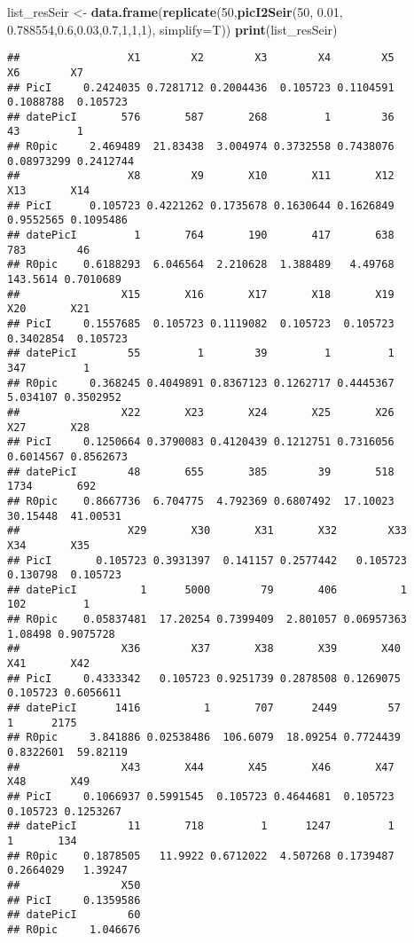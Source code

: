 \documentclass[
]{article}
\newenvironment{Shaded}{\begin{snugshade}}{\end{snugshade}}
\newcommand{\DataTypeTok}[1]{\textcolor[rgb]{0.13,0.29,0.53}{#1}}
\newcommand{\DecValTok}[1]{\textcolor[rgb]{0.00,0.00,0.81}{#1}}
\newcommand{\FloatTok}[1]{\textcolor[rgb]{0.00,0.00,0.81}{#1}}
\newcommand{\KeywordTok}[1]{\textcolor[rgb]{0.13,0.29,0.53}{\textbf{#1}}}
\newcommand{\NormalTok}[1]{#1}
\newcommand{\StringTok}[1]{\textcolor[rgb]{0.31,0.60,0.02}{#1}}
\begin{document}
\begin{Shaded}
\begin{Highlighting}[]
\NormalTok{list_resSeir <-}\StringTok{ }\KeywordTok{data.frame}\NormalTok{(}\KeywordTok{replicate}\NormalTok{(}\DecValTok{50}\NormalTok{,}\KeywordTok{picI2Seir}\NormalTok{(}\DecValTok{50}\NormalTok{, }\FloatTok{0.01}\NormalTok{, }\FloatTok{0.788554}\NormalTok{,}\FloatTok{0.6}\NormalTok{,}\FloatTok{0.03}\NormalTok{,}\FloatTok{0.7}\NormalTok{,}\DecValTok{1}\NormalTok{,}\DecValTok{1}\NormalTok{,}\DecValTok{1}\NormalTok{), }\DataTypeTok{simplify=}\NormalTok{T))}
\KeywordTok{print}\NormalTok{(list_resSeir)}
\end{Highlighting}
\end{Shaded}

\begin{verbatim}
##                 X1        X2        X3        X4        X5         X6        X7
## PicI     0.2424035 0.7281712 0.2004436  0.105723 0.1104591  0.1088788  0.105723
## datePicI       576       587       268         1        36         43         1
## R0pic     2.469489  21.83438  3.004974 0.3732558 0.7438076 0.08973299 0.2412744
##                 X8        X9       X10       X11       X12       X13       X14
## PicI      0.105723 0.4221262 0.1735678 0.1630644 0.1626849 0.9552565 0.1095486
## datePicI         1       764       190       417       638       783        46
## R0pic    0.6188293  6.046564  2.210628  1.388489   4.49768  143.5614 0.7010689
##                X15       X16       X17       X18       X19       X20       X21
## PicI     0.1557685  0.105723 0.1119082  0.105723  0.105723 0.3402854  0.105723
## datePicI        55         1        39         1         1       347         1
## R0pic     0.368245 0.4049891 0.8367123 0.1262717 0.4445367  5.034107 0.3502952
##                X22       X23       X24       X25       X26       X27       X28
## PicI     0.1250664 0.3790083 0.4120439 0.1212751 0.7316056 0.6014567 0.8562673
## datePicI        48       655       385        39       518      1734       692
## R0pic    0.8667736  6.704775  4.792369 0.6807492  17.10023  30.15448  41.00531
##                 X29       X30       X31       X32        X33      X34       X35
## PicI       0.105723 0.3931397  0.141157 0.2577442   0.105723 0.130798  0.105723
## datePicI          1      5000        79       406          1      102         1
## R0pic    0.05837481  17.20254 0.7399409  2.801057 0.06957363  1.08498 0.9075728
##                X36        X37       X38       X39       X40       X41       X42
## PicI     0.4333342   0.105723 0.9251739 0.2878508 0.1269075  0.105723 0.6056611
## datePicI      1416          1       707      2449        57         1      2175
## R0pic     3.841886 0.02538486  106.6079  18.09254 0.7724439 0.8322601  59.82119
##                X43       X44       X45       X46       X47       X48       X49
## PicI     0.1066937 0.5991545  0.105723 0.4644681  0.105723  0.105723 0.1253267
## datePicI        11       718         1      1247         1         1       134
## R0pic    0.1878505   11.9922 0.6712022  4.507268 0.1739487 0.2664029   1.39247
##                X50
## PicI     0.1359586
## datePicI        60
## R0pic     1.046676
\end{verbatim}
\end{document}
